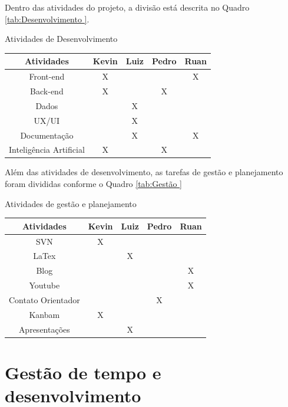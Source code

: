 Dentro das atividades do projeto, a divisão está descrita no Quadro \ref{tab:Desenvolvimento }.
    \begin{quadro} [h]
    \centering
        \caption{Atividades de Desenvolvimento}\label{tab:Desenvolvimento }
 	\begin{tabular}{|c|c|c|c|c|}
        \hline
\textbf{Atividades}&\textbf{Kevin}&\textbf{Luiz}&\textbf{Pedro}&\textbf{Ruan} \\ \hline
Front-end &X & & &X \\ \hline
Back-end &X & &X & \\ \hline
Dados & &X & & \\ \hline
UX/UI & &X & & \\ \hline
Documentação & &X & &X \\ \hline
Inteligência Artificial &X & &X &\\ \hline
\end{tabular}
    \end{quadro}


Além das atividades de desenvolvimento, as tarefas de gestão e planejamento foram divididas conforme o Quadro \ref{tab:Gestão }



    \begin{quadro} [h]
            \centering
 	    \caption{Atividades de gestão e planejamento} \label{tab:Gestão }



        \begin{tabular}{|c|c|c|c|c|}
    \hline
    \textbf{Atividades}&\textbf{Kevin}&\textbf{Luiz}&\textbf{Pedro}&\textbf{Ruan} \\    \hline
    SVN &X & & & \\ \hline
    LaTex & &X & & \\  \hline
    Blog & & & &X \\ \hline
    Youtube & & & &X \\ \hline
    Contato Orientador & & &X & \\ \hline
    Kanbam &X & & & \\ \hline
    Apresentações & &X & & \\ \hline
        \end{tabular}
    \end{quadro}


\section{Gestão de tempo e desenvolvimento}

